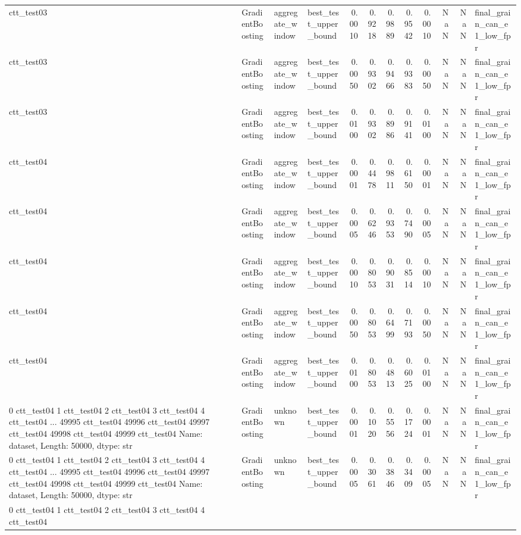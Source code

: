 \begin{tabular}{llllrrrrrrrl}
ctt_test03 & GradientBoosting & aggregate_window & best_test_upper_bound & 0.0010 & 0.9218 & 0.9889 & 0.9542 & 0.0010 & NaN & NaN & final_grain_can_e1_low_fpr \\
ctt_test03 & GradientBoosting & aggregate_window & best_test_upper_bound & 0.0050 & 0.9302 & 0.9466 & 0.9383 & 0.0050 & NaN & NaN & final_grain_can_e1_low_fpr \\
ctt_test03 & GradientBoosting & aggregate_window & best_test_upper_bound & 0.0100 & 0.9302 & 0.8986 & 0.9141 & 0.0100 & NaN & NaN & final_grain_can_e1_low_fpr \\
ctt_test04 & GradientBoosting & aggregate_window & best_test_upper_bound & 0.0001 & 0.4478 & 0.9811 & 0.6150 & 0.0001 & NaN & NaN & final_grain_can_e1_low_fpr \\
ctt_test04 & GradientBoosting & aggregate_window & best_test_upper_bound & 0.0005 & 0.6246 & 0.9353 & 0.7490 & 0.0005 & NaN & NaN & final_grain_can_e1_low_fpr \\
ctt_test04 & GradientBoosting & aggregate_window & best_test_upper_bound & 0.0010 & 0.8053 & 0.9031 & 0.8514 & 0.0010 & NaN & NaN & final_grain_can_e1_low_fpr \\
ctt_test04 & GradientBoosting & aggregate_window & best_test_upper_bound & 0.0050 & 0.8053 & 0.6499 & 0.7193 & 0.0050 & NaN & NaN & final_grain_can_e1_low_fpr \\
ctt_test04 & GradientBoosting & aggregate_window & best_test_upper_bound & 0.0100 & 0.8053 & 0.4813 & 0.6025 & 0.0100 & NaN & NaN & final_grain_can_e1_low_fpr \\
0        ctt_test04
1        ctt_test04
2        ctt_test04
3        ctt_test04
4        ctt_test04
            ...    
49995    ctt_test04
49996    ctt_test04
49997    ctt_test04
49998    ctt_test04
49999    ctt_test04
Name: dataset, Length: 50000, dtype: str & GradientBoosting & unknown & best_test_upper_bound & 0.0001 & 0.1020 & 0.5556 & 0.1724 & 0.0001 & NaN & NaN & final_grain_can_e1_low_fpr \\
0        ctt_test04
1        ctt_test04
2        ctt_test04
3        ctt_test04
4        ctt_test04
            ...    
49995    ctt_test04
49996    ctt_test04
49997    ctt_test04
49998    ctt_test04
49999    ctt_test04
Name: dataset, Length: 50000, dtype: str & GradientBoosting & unknown & best_test_upper_bound & 0.0005 & 0.3061 & 0.3846 & 0.3409 & 0.0005 & NaN & NaN & final_grain_can_e1_low_fpr \\
0        ctt_test04
1        ctt_test04
2        ctt_test04
3        ctt_test04
4        ctt_test04

\end{tabular}
